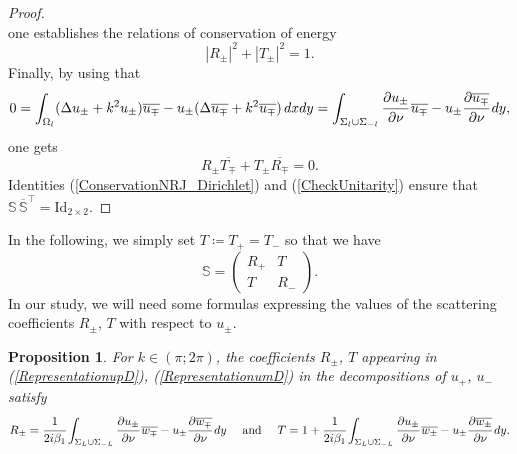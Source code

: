 \documentclass[11pt,a4paper]{report}
\newcommand{\dsp}{\displaystyle}
\newcommand{\Om}{\Omega}
\newcommand{\mrm}[1]{\mathrm{#1}}
\newtheorem{proposition}[theorem]{Proposition}
\begin{document}
\begin{proof}
\[\]
one establishes the relations of conservation of energy
\begin{equation}\label{ConservationNRJ_Dirichlet}
|R_\pm|^2+|T_\pm|^2=1.
\end{equation}
Finally, by using that 
\[
0=\int_{\Om_{l}} (\Delta u_\pm+k^2u_\pm)\overline{u_\mp}-u_\pm(\Delta \overline{u_\mp}+k^2\overline{u_\mp})\,dxdy=\int_{\Sigma_{l}\cup\Sigma_{-l}}\cfrac{\partial u_\pm}{\partial \nu}\,\overline{u_\mp}-u_\pm\cfrac{\partial \overline{u_\mp}}{\partial \nu}\,dy,
\]
one gets 
\begin{equation}\label{CheckUnitarity}
R_{\pm}\overline{T_{\mp}}+T_{\pm}\overline{R_{\mp}}=0.
\end{equation}
Identities (\ref{ConservationNRJ_Dirichlet}) and (\ref{CheckUnitarity}) ensure that $\mathbb{S}\,\overline{\mathbb{S}}^{\top}=\mrm{Id}_{2\times2}$.
\end{proof}
\noindent In the following, we simply set $T\coloneqq T_+=T_-$ so that we have
\[
\mathbb{S}=\left( 
\begin{array}{cc}
R_+ & T \\[2pt]
T & R_- 
\end{array}
\right).
\]
In our study, we will need some formulas expressing the values of the scattering coefficients $R_\pm$, $T$ with respect to $u_\pm$.
\begin{proposition}\label{PropoRepresentationD}
For $k\in(\pi;2\pi)$, the coefficients $R_{\pm}$, $T$ appearing in (\ref{RepresentationupD}), (\ref{RepresentationumD}) in the decompositions of $u_+$, $u_-$ satisfy
\[
R_{\pm}=\cfrac{1}{2i\beta_1}\dsp\int_{\Sigma_{L}\cup\Sigma_{-L}}\cfrac{\partial u_\pm}{\partial \nu}\,\overline{w_\mp}-u_\pm\cfrac{\partial \overline{w_\mp}}{\partial \nu}\,dy\quad \mbox{ and }\quad T=1+\cfrac{1}{2i\beta_1}\dsp\int_{\Sigma_{L}\cup\Sigma_{-L}}\cfrac{\partial u_\pm}{\partial \nu}\,\overline{w_\pm}-u_\pm\cfrac{\partial \overline{w_\pm}}{\partial \nu}\,dy.
\]
\end{proposition}
\end{document}

